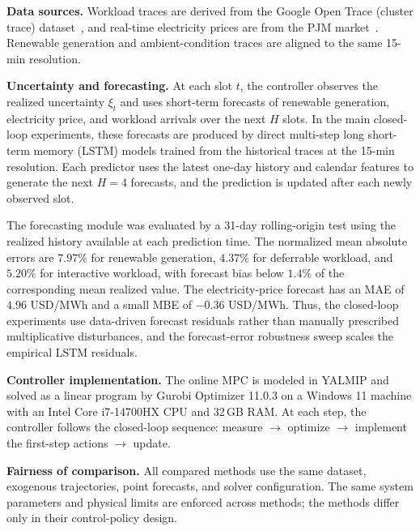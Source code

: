 \documentclass[a4paper,fleqn]{cas-dc}
\theoremstyle{plain}
\theoremstyle{remark}
\theoremstyle{plain}
\begin{document}
\noindent\textbf{Data sources.}
Workload traces are derived from the Google Open Trace (cluster trace) dataset~\cite{google2019_cluster_trace}, and real-time electricity
prices are from the PJM market~\cite{pjm_dataminer2}. Renewable generation and ambient-condition traces are aligned to the same 15-min resolution.

\noindent\textbf{Uncertainty and forecasting.}
At each slot $t$, the controller observes the realized uncertainty $\xi_t$ and uses short-term forecasts of renewable generation, electricity price, and workload arrivals over the next $H$ slots.
In the main closed-loop experiments, these forecasts are produced by direct multi-step long short-term memory (LSTM) models trained from the historical traces at the 15-min resolution. Each predictor uses the latest one-day history and calendar features to generate the next $H=4$ forecasts, and the prediction is updated after each newly observed slot.

The forecasting module was evaluated by a 31-day rolling-origin test using the realized history available at each prediction time. The normalized mean absolute errors are $7.97\%$ for renewable generation, $4.37\%$ for deferrable workload, and $5.20\%$ for interactive workload, with forecast bias below $1.4\%$ of the corresponding mean realized value. The electricity-price forecast has an MAE of $4.96$ USD/MWh and a small MBE of $-0.36$ USD/MWh. Thus, the closed-loop experiments use data-driven forecast residuals rather than manually prescribed multiplicative disturbances, and the forecast-error robustness sweep scales the empirical LSTM residuals.

\noindent\textbf{Controller implementation.}
The online MPC is modeled in YALMIP and solved as a linear program by Gurobi Optimizer 11.0.3 on a Windows 11 machine with an Intel Core i7-14700HX CPU and 32\,GB RAM. At each step, the controller follows the closed-loop sequence: measure $\rightarrow$ optimize $\rightarrow$ implement the first-step actions $\rightarrow$ update.

\noindent\textbf{Fairness of comparison.}
All compared methods use the same dataset, exogenous trajectories, point forecasts, and solver configuration. The same system parameters and physical limits are enforced across methods; the methods differ only in their control-policy design.
\end{document}
